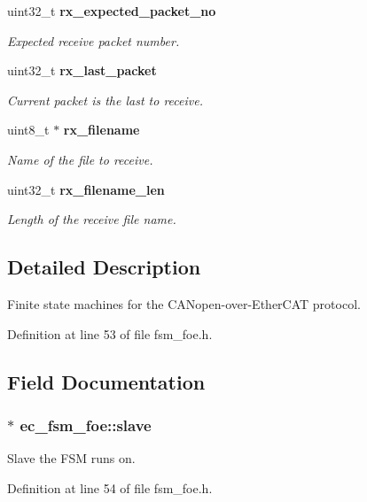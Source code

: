 \begin{DoxyCompactItemize}
uint32\-\_\-t {\bf rx\-\_\-expected\-\_\-packet\-\_\-no}
\begin{DoxyCompactList}\small\item\em \-Expected receive packet number. \end{DoxyCompactList}\item 
uint32\-\_\-t {\bf rx\-\_\-last\-\_\-packet}
\begin{DoxyCompactList}\small\item\em \-Current packet is the last to receive. \end{DoxyCompactList}\item 
uint8\-\_\-t $\ast$ {\bf rx\-\_\-filename}
\begin{DoxyCompactList}\small\item\em \-Name of the file to receive. \end{DoxyCompactList}\item 
uint32\-\_\-t {\bf rx\-\_\-filename\-\_\-len}
\begin{DoxyCompactList}\small\item\em \-Length of the receive file name. \end{DoxyCompactList}\end{DoxyCompactItemize}


\subsection{\-Detailed \-Description}
\-Finite state machines for the \-C\-A\-Nopen-\/over-\/\-Ether\-C\-A\-T protocol. 

\-Definition at line 53 of file fsm\-\_\-foe.\-h.



\subsection{\-Field \-Documentation}
\subsubsection[{slave}]{$\ast$ {\bf ec\-\_\-fsm\-\_\-foe\-::slave}}\label{structec__fsm__foe_ae4d76e0ce8fa63d0dcd8b843933a49af}


\-Slave the \-F\-S\-M runs on. 



\-Definition at line 54 of file fsm\-\_\-foe.\-h.

